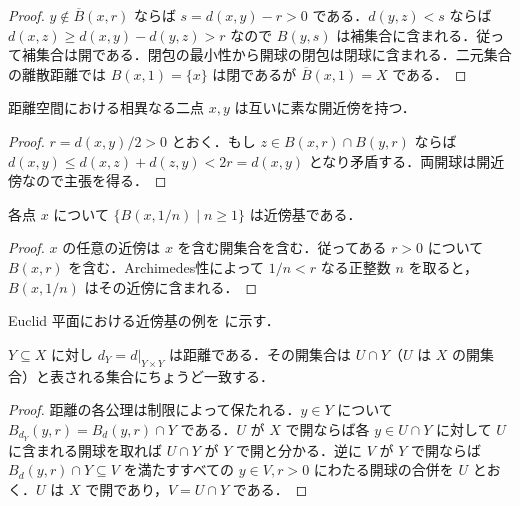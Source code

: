 \begin{proof}
$y\notin\overline B(x,r)$ ならば $s=d(x,y)-r>0$ である．$d(y,z)<s$ ならば $d(x,z)\geq d(x,y)-d(y,z)>r$ なので $B(y,s)$ は補集合に含まれる．従って補集合は開である．閉包の最小性から開球の閉包は閉球に含まれる．二元集合の離散距離では $B(x,1)=\{x\}$ は閉であるが $\overline B(x,1)=X$ である．
\end{proof}
\begin{prop}[距離空間の分離性]
距離空間における相異なる二点 $x,y$ は互いに素な開近傍を持つ．
\end{prop}
\begin{proof}
$r=d(x,y)/2>0$ とおく．もし $z\in B(x,r)\cap B(y,r)$ ならば $d(x,y)\leq d(x,z)+d(z,y)<2r=d(x,y)$ となり矛盾する．両開球は開近傍なので主張を得る．
\end{proof}
\begin{prop}[距離空間の可算近傍基]
各点 $x$ について $\{B(x,1/n)\mid n\geq1\}$ は近傍基である．
\end{prop}
\begin{proof}
$x$ の任意の近傍は $x$ を含む開集合を含む．従ってある $r>0$ について $B(x,r)$ を含む．Archimedes性によって $1/n<r$ なる正整数 $n$ を取ると，$B(x,1/n)$ はその近傍に含まれる．
\end{proof}
Euclid 平面における近傍基の例を  に示す．
\begin{prop}[部分集合に誘導される距離]
$Y\subseteq X$ に対し $d_Y=d|_{Y\times Y}$ は距離である．その開集合は $U\cap Y$（$U$ は $X$ の開集合）と表される集合にちょうど一致する．
\end{prop}
\begin{proof}
距離の各公理は制限によって保たれる．$y\in Y$ について $B_{d_Y}(y,r)=B_d(y,r)\cap Y$ である．$U$ が $X$ で開ならば各 $y\in U\cap Y$ に対して $U$ に含まれる開球を取れば $U\cap Y$ が $Y$ で開と分かる．逆に $V$ が $Y$ で開ならば $B_d(y,r)\cap Y\subseteq V$ を満たすすべての $y\in V,r>0$ にわたる開球の合併を $U$ とおく．$U$ は $X$ で開であり，$V=U\cap Y$ である．
\end{proof}
